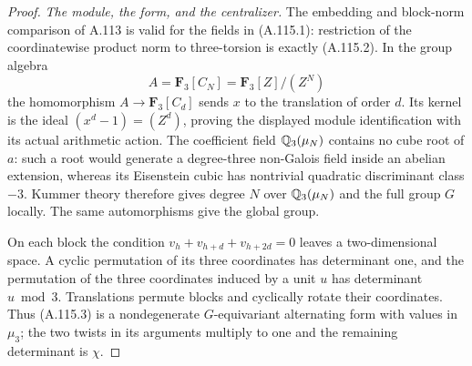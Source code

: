 \begin{proof}
\emph{The module, the form, and the centralizer.}
The embedding and block-norm comparison of A.113
is valid for the fields in (A.115.1): restriction
of the coordinatewise product norm to three-torsion
is exactly (A.115.2).  In the group algebra
\[
 A=\mathbf F_3[C_N]=\mathbf F_3[Z]/(Z^N)
\]
the homomorphism $A\to\mathbf F_3[C_d]$ sends $x$ to
the translation of order $d$.  Its kernel is the
ideal $(x^d-1)=(Z^d)$, proving the displayed module
identification with its actual arithmetic action.
The coefficient field $\mathbb Q_3(\mu_N)$ contains no cube
root of $a$: such a root would generate a degree-three
non-Galois field inside an abelian extension, whereas
its Eisenstein cubic has nontrivial quadratic
discriminant class $-3$.
Kummer theory therefore gives degree $N$ over
$\mathbb Q_3(\mu_N)$ and the full group $G$ locally.
The same automorphisms give the global group.

On each block the condition $v_h+v_{h+d}+v_{h+2d}=0$
leaves a two-dimensional space.  A cyclic permutation
of its three coordinates has determinant one, and
the permutation of the three coordinates induced by
a unit $u$ has determinant $u\bmod3$.
Translations permute blocks and cyclically rotate
their coordinates.  Thus (A.115.3) is a nondegenerate
$G$-equivariant alternating form with values in
$\mu_3$; the two twists in its arguments multiply
to one and the remaining determinant is $\chi$.


\end{proof}
